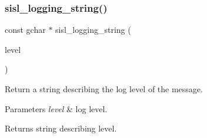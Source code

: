 \subsubsection{\texorpdfstring{sisl\+\_\+logging\+\_\+string()}{sisl\_logging\_string()}}
{\footnotesize\ttfamily const gchar $\ast$ sisl\+\_\+logging\+\_\+string (\begin{DoxyParamCaption}\item[{G\+Log\+Level\+Flags}]{level }\end{DoxyParamCaption})}

Return a string describing the log level of the message.


\begin{DoxyParams}{Parameters}
{\em level} & log level.\\
\hline
\end{DoxyParams}
\begin{DoxyReturn}{Returns}
string describing level. 
\end{DoxyReturn}
